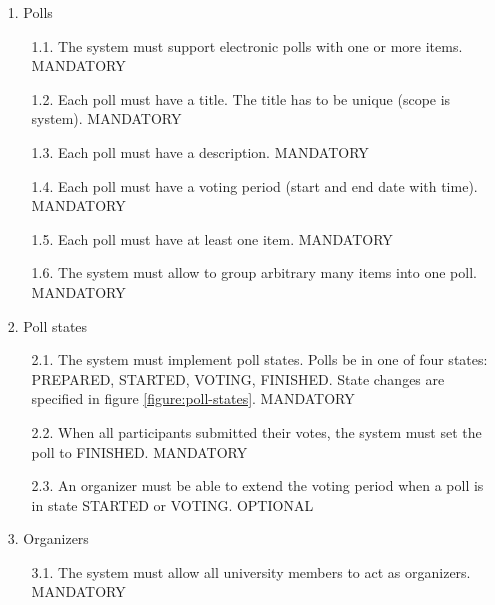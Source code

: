 \begin{enumerate}

\item[1.] Polls

	\begin{enumerate}
	\item
	[1.1.] The system must support electronic polls with one or more items. MANDATORY
	
	
	\item
	[1.2.] Each poll must have a title. The title has to be unique (scope is system). MANDATORY
	
	
	\item
	[1.3.] Each poll must have a description. MANDATORY
	
	
	\item
	[1.4.] Each poll must have a voting period (start and end date with time). MANDATORY
	
	
	\item
	[1.5.] Each poll must have at least one item. MANDATORY
	
	
	\item
	[1.6.] The system must allow to group arbitrary many items into one poll. MANDATORY
	
	\end{enumerate}




\item[2.] Poll states

	\begin{enumerate}
	\item
	[2.1.] The system must implement poll states. Polls be in one of four states: PREPARED, STARTED,
	VOTING, FINISHED. State changes are specified in figure \ref{figure:poll-states}. MANDATORY
	
	
	\item
	[2.2.] When all participants submitted their votes, the system must set the poll to FINISHED.
	MANDATORY
	
	
	\item
	[2.3.] An organizer must be able to extend the voting period when a poll is in state STARTED or
	VOTING. OPTIONAL
	\end{enumerate}




\item[3.] Organizers

	\begin{enumerate}
	\item
	[3.1.] The system must allow all university members to act as organizers. MANDATORY
	

\end{enumerate}
\end{enumerate}
